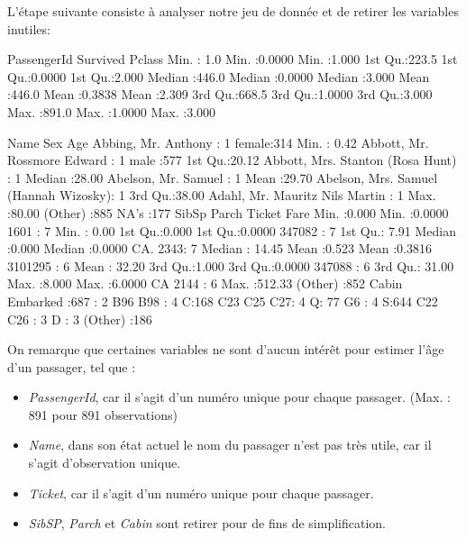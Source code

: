 \documentclass[11pt,french]{report}
\begin{document}
L'étape suivante consiste à analyser notre jeu de donnée et de retirer les variables inutiles:
\begin{Schunk}
\begin{Soutput}
  PassengerId       Survived          Pclass     
 Min.   :  1.0   Min.   :0.0000   Min.   :1.000  
 1st Qu.:223.5   1st Qu.:0.0000   1st Qu.:2.000  
 Median :446.0   Median :0.0000   Median :3.000  
 Mean   :446.0   Mean   :0.3838   Mean   :2.309  
 3rd Qu.:668.5   3rd Qu.:1.0000   3rd Qu.:3.000  
 Max.   :891.0   Max.   :1.0000   Max.   :3.000  
                                                 
                                    Name         Sex           Age       
 Abbing, Mr. Anthony                  :  1   female:314   Min.   : 0.42  
 Abbott, Mr. Rossmore Edward          :  1   male  :577   1st Qu.:20.12  
 Abbott, Mrs. Stanton (Rosa Hunt)     :  1                Median :28.00  
 Abelson, Mr. Samuel                  :  1                Mean   :29.70  
 Abelson, Mrs. Samuel (Hannah Wizosky):  1                3rd Qu.:38.00  
 Adahl, Mr. Mauritz Nils Martin       :  1                Max.   :80.00  
 (Other)                              :885                NA's   :177    
     SibSp           Parch             Ticket         Fare       
 Min.   :0.000   Min.   :0.0000   1601    :  7   Min.   :  0.00  
 1st Qu.:0.000   1st Qu.:0.0000   347082  :  7   1st Qu.:  7.91  
 Median :0.000   Median :0.0000   CA. 2343:  7   Median : 14.45  
 Mean   :0.523   Mean   :0.3816   3101295 :  6   Mean   : 32.20  
 3rd Qu.:1.000   3rd Qu.:0.0000   347088  :  6   3rd Qu.: 31.00  
 Max.   :8.000   Max.   :6.0000   CA 2144 :  6   Max.   :512.33  
                                  (Other) :852                   
         Cabin     Embarked
            :687    :  2   
 B96 B98    :  4   C:168   
 C23 C25 C27:  4   Q: 77   
 G6         :  4   S:644   
 C22 C26    :  3           
 D          :  3           
 (Other)    :186           
\end{Soutput}
\end{Schunk}

On remarque que certaines variables ne sont d'aucun intérêt pour estimer l'âge d'un passager, tel que :
\bigskip

\begin{itemize}
\item \emph{PassengerId}, car il s'agit d'un numéro unique pour chaque passager. (Max. : 891 pour 891 observations)
\item \emph{Name}, dans son état actuel le nom du passager n'est pas très utile, car il s'agit d'observation unique.
\item \emph{Ticket}, car il s'agit d'un numéro unique pour chaque passager.
\item \emph{SibSP}, \emph{Parch} et \emph{Cabin} sont retirer pour de fins de simplification. 
\end{itemize}
\end{document}
